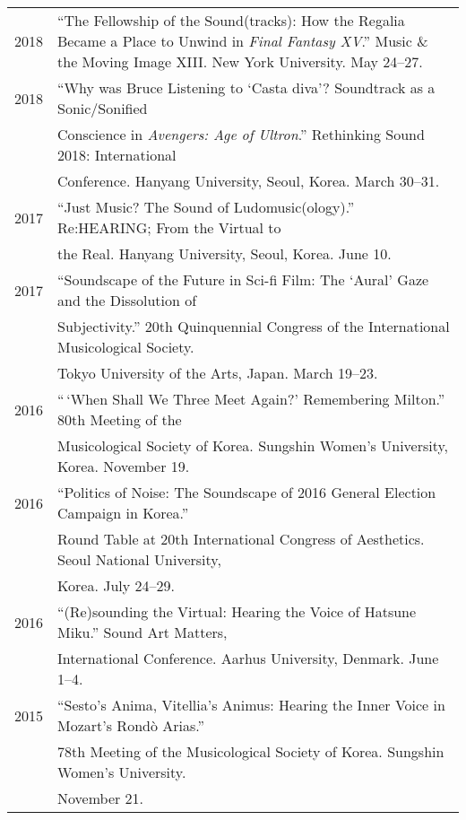 \documentclass[a4paper,11pt]{article}
\begin{document}
  \hspace*{-0.25cm}
  \begin{tabular}{p{2.5cm} p{12.5cm}}
  2018 & ``The Fellowship of the Sound(tracks): How the Regalia Became a Place to Unwind in \textit{Final Fantasy XV}.'' Music \& the Moving Image XIII. New York University. May 24--27.\\[2mm]
  
  2018 & ``Why was Bruce Listening to `Casta diva'? Soundtrack as a Sonic/Sonified\\
  & Conscience in \textit{Avengers: Age of Ultron}.'' Rethinking Sound 2018: International\\
  & Conference. Hanyang University, Seoul, Korea. March 30--31.\\[2mm]
  
  2017 & ``Just Music? The Sound of Ludomusic(ology).'' Re:HEARING; From the Virtual to\\
  & the Real. Hanyang University, Seoul, Korea. June 10.\\[2mm]
  
  2017 & ``Soundscape of the Future in Sci-fi Film: The ‘Aural’ Gaze and the Dissolution of\\
  & Subjectivity.'' 20th Quinquennial Congress of the International Musicological Society.\\
  & Tokyo University of the Arts, Japan. March 19--23.\\[2mm]
  
  2016 & ``\,`When Shall We Three Meet Again?' Remembering Milton.'' 80th Meeting of the\\
  & Musicological Society of Korea. Sungshin Women's University, Korea. November 19.\\[2mm]

  2016 & ``Politics of Noise: The Soundscape of 2016 General Election Campaign in Korea.''\\
  & Round Table at 20th International Congress of Aesthetics. Seoul National University,\\
  & Korea. July 24--29.\\[2mm]
  
  2016 & ``(Re)sounding the Virtual: Hearing the Voice of Hatsune Miku.'' Sound Art Matters,\\
  & International Conference. Aarhus University, Denmark. June 1--4.\\[2mm]
  
  2015 & ``Sesto's Anima, Vitellia's Animus: Hearing the Inner Voice in Mozart’s Rond\`{o} Arias.''\\
  & 78th Meeting of the Musicological Society of Korea. Sungshin Women's University.\\
  & November 21.\\[2mm]
  

\end{tabular}
\end{document}
